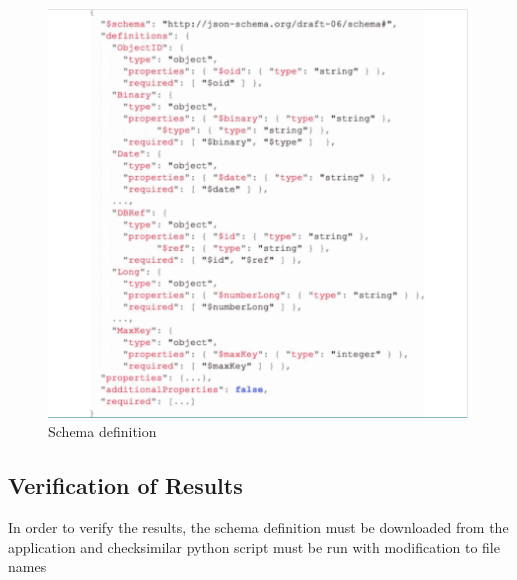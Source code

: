 \documentclass[sigconf, nonacm]{acmart}
\begin{document}
\begin{figure}
  \centering
  \includegraphics[width=\linewidth]{figures/figure2.PNG}
  \caption{Schema definition}
  \label{fig:schema definition}
\end{figure}


\subsection{Verification of Results}
 In order to verify the results, the schema definition must be downloaded from the application and checksimilar python script must be run with modification to file names




\end{document}
